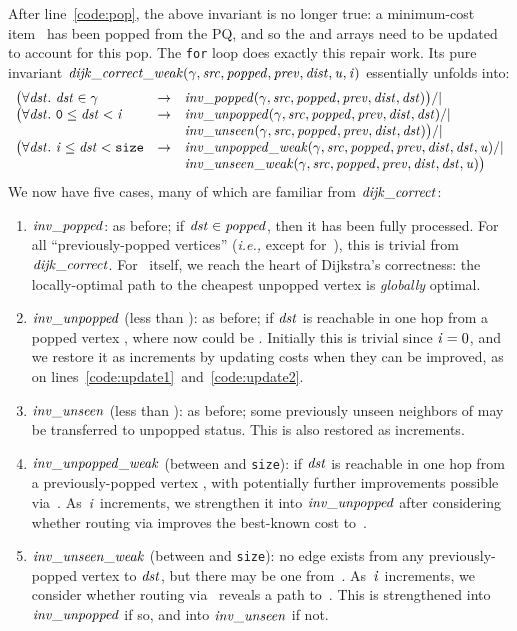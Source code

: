 After line~\ref{code:pop},
the above invariant is no longer true: a minimum-cost item~ has been
popped from the PQ, and so the  and  arrays need to be
updated to account for this pop. The \texttt{for} loop does exactly this repair work.
Its pure invariant
$\mathit{dijk\_correct\_weak}(\gamma, \mathit{src}, \mathit{popped}, \mathit{prev}, \mathit{dist}, \mathit{u}, \mathit{i})$ essentially unfolds into:
\[
\begin{array}{lcl}
\big(\forall \m{dst}.~\m{dst} \in \gamma & -> & \m{inv\_popped}(\gamma, \m{src}, \m{popped}, \m{prev}, \m{dist}, \m{dst})\big) /| \null \\
\big(\forall \m{dst}.~\texttt{0} \le \m{dst} < \m{i} & -> & \m{inv\_unpopped}(\gamma, \m{src}, \m{popped}, \m{prev}, \m{dist}, \m{dst}) /| \null \\
&& \m{inv\_unseen}(\gamma, \m{src}, \m{popped}, \m{prev}, \m{dist}, \m{dst}) \big) /| \null \\
\big(\forall \m{dst}.~\m{i} \le \m{dst} < \texttt{size} & -> & \m{inv\_unpopped\_weak}(\gamma, \m{src}, \m{popped}, \m{prev}, \m{dist}, \m{dst}, \m{u}) /| \null \\
&&\m{inv\_unseen\_weak}(\gamma, \m{src}, \m{popped}, \m{prev}, \m{dist}, \m{dst}, \m{u}) \big)
\end{array}
\]
We now have five cases, many of which are familiar from $\mathit{dijk\_correct}$:
\begin{enumerate}
\item $\mathit{inv\_popped}$: as before; if $\mathit{dst} \in \mathit{popped}$, then it has been fully processed.  
For all ``previously-popped vertices'' (\emph{i.e., }except for~),
this is trivial from $\mathit{dijk\_correct}$. For~ itself, we reach the heart of Dijkstra's correctness:
the locally-optimal path to the cheapest unpopped vertex is
\emph{globally} optimal.
\item $\mathit{inv\_unpopped}$ (less than ): as before; if $\mathit{dst}$ is reachable in
one hop from a popped vertex , where now  could be . Initially this is trivial since $\mathit{i}=0$, and we restore it as  increments by updating costs when they can be improved, as on lines~\ref{code:update1}~and~\ref{code:update2}.
\item $\mathit{inv\_unseen}$ (less than ): as before; some previously unseen neighbors of  may be transferred to unpopped status.  This is also restored as  increments.
\item $\mathit{inv\_unpopped\_weak}$ (between  and \texttt{size}):
if $\mathit{dst}$ is reachable in one hop from a previously-popped vertex ,
with potentially further improvements possible via~.
As~$\mathit{i}$ increments, we strengthen it
into $\mathit{inv\_unpopped}$ after considering whether routing via
 improves the best-known cost to~.
\item $\mathit{inv\_unseen\_weak}$ (between  and \texttt{size}):
no edge exists from any previously-popped vertex to
$\mathit{dst}$, but there may be one from~.
As~$\mathit{i}$ increments, we consider whether routing via~
reveals a path to~.
This is strengthened into
$\mathit{inv\_unpopped}$ if so, and into
$\mathit{inv\_unseen}$ if not.
\end{enumerate}
